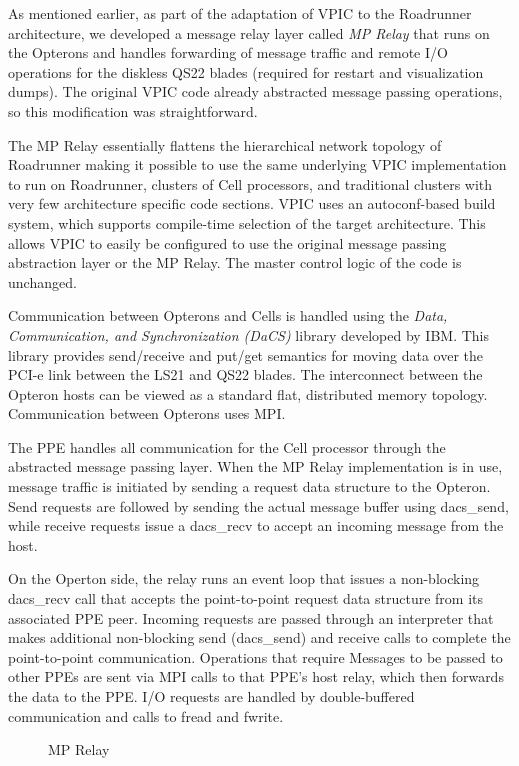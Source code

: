 \documentclass[letter,10pt]{article}
\begin{document}
As mentioned earlier, as part of the adaptation of VPIC to the
Roadrunner architecture, we developed a message relay layer
called \emph{MP Relay}
that runs on the Opterons and handles forwarding
of message traffic and remote I/O operations for the diskless
QS22 blades (required for restart and visualization dumps).
The original VPIC code already abstracted message passing
operations, so this modification was straightforward.

The MP Relay essentially flattens the hierarchical network topology of
Roadrunner making it possible to use the same underlying
VPIC implementation to run on Roadrunner, clusters of Cell processors,
and traditional clusters with very few architecture specific code 
sections.  VPIC uses an autoconf-based build system, which supports
compile-time selection of the target architecture.  This allows
VPIC to easily be configured to use the original message passing
abstraction layer or the MP Relay.  The master control logic of the
code is unchanged.

Communication between Opterons and Cells is handled using the
\emph{Data, Communication, and Synchronization (DaCS)} library developed by
IBM.  This library provides send/receive and put/get semantics
for moving data over the PCI-e link between the LS21 and QS22 blades.
The interconnect between the Opteron hosts can be viewed as
a standard flat, distributed memory topology.  Communication between
Opterons uses MPI.

The PPE handles all communication for the Cell processor through the
abstracted message passing layer.  When the MP Relay implementation
is in use, message traffic is initiated by sending a request data
structure to the Opteron.  Send requests are followed by 
sending the actual message buffer using dacs\_send, while receive requests
issue a dacs\_recv to accept an incoming message from the host.

On the Operton side, the relay runs an event loop that issues
a non-blocking dacs\_recv call that accepts the point-to-point request
data structure from its associated PPE peer.
Incoming requests are passed through an interpreter
that makes additional non-blocking
send (dacs\_send) and receive calls to complete the
point-to-point communication.  Operations that require
Messages to be
passed to other PPEs are sent via MPI calls to that PPE's host relay,
which then forwards the data to the PPE.
I/O requests are handled by double-buffered communication and
calls to fread and fwrite.

\begin{figure}
    \begin{center}
    \scalebox{0.25}{}
    \caption{MP Relay}
    \label{fig:relay}
    \end{center}
\end{figure}
\end{document}
